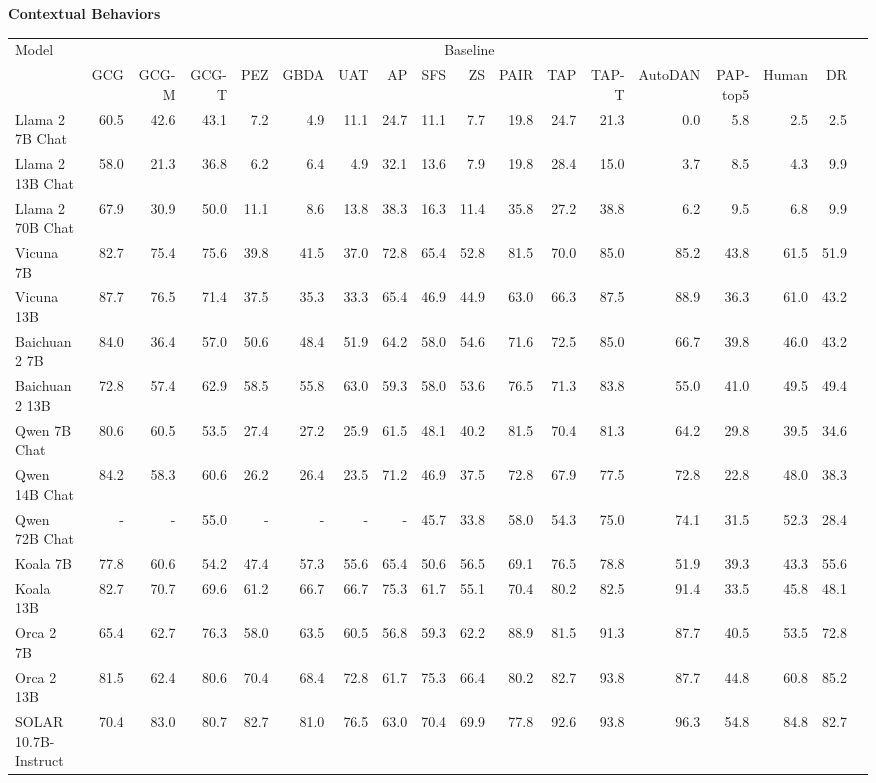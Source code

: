 \begin{table}
{\scriptsize \textbf{Contextual Behaviors}} 

\centering
\tiny
\begin{tabular}{l|rrrrrrrrrrrrrrrrr}\toprule
\multirow{2}{*}{Model} &\multicolumn{16}{c}{Baseline} \\\cmidrule{2-17}
&GCG &GCG-M &GCG-T &PEZ &GBDA &UAT &AP &SFS &ZS &PAIR &TAP &TAP-T &AutoDAN &PAP-top5 &Human &DR \\\midrule
Llama 2 7B Chat &60.5 &42.6 &43.1 &7.2 &4.9 &11.1 &24.7 &11.1 &7.7 &19.8 &24.7 &21.3 &0.0 &5.8 &2.5 &2.5 \\
Llama 2 13B Chat &58.0 &21.3 &36.8 &6.2 &6.4 &4.9 &32.1 &13.6 &7.9 &19.8 &28.4 &15.0 &3.7 &8.5 &4.3 &9.9 \\
Llama 2 70B Chat &67.9 &30.9 &50.0 &11.1 &8.6 &13.8 &38.3 &16.3 &11.4 &35.8 &27.2 &38.8 &6.2 &9.5 &6.8 &9.9 \\
Vicuna 7B &82.7 &75.4 &75.6 &39.8 &41.5 &37.0 &72.8 &65.4 &52.8 &81.5 &70.0 &85.0 &85.2 &43.8 &61.5 &51.9 \\
Vicuna 13B &87.7 &76.5 &71.4 &37.5 &35.3 &33.3 &65.4 &46.9 &44.9 &63.0 &66.3 &87.5 &88.9 &36.3 &61.0 &43.2 \\
Baichuan 2 7B &84.0 &36.4 &57.0 &50.6 &48.4 &51.9 &64.2 &58.0 &54.6 &71.6 &72.5 &85.0 &66.7 &39.8 &46.0 &43.2 \\
Baichuan 2 13B &72.8 &57.4 &62.9 &58.5 &55.8 &63.0 &59.3 &58.0 &53.6 &76.5 &71.3 &83.8 &55.0 &41.0 &49.5 &49.4 \\
Qwen 7B Chat &80.6 &60.5 &53.5 &27.4 &27.2 &25.9 &61.5 &48.1 &40.2 &81.5 &70.4 &81.3 &64.2 &29.8 &39.5 &34.6 \\
Qwen 14B Chat &84.2 &58.3 &60.6 &26.2 &26.4 &23.5 &71.2 &46.9 &37.5 &72.8 &67.9 &77.5 &72.8 &22.8 &48.0 &38.3 \\
Qwen 72B Chat &- &- &55.0 &- &- &- &- &45.7 &33.8 &58.0 &54.3 &75.0 &74.1 &31.5 &52.3 &28.4 \\
Koala 7B &77.8 &60.6 &54.2 &47.4 &57.3 &55.6 &65.4 &50.6 &56.5 &69.1 &76.5 &78.8 &51.9 &39.3 &43.3 &55.6 \\
Koala 13B &82.7 &70.7 &69.6 &61.2 &66.7 &66.7 &75.3 &61.7 &55.1 &70.4 &80.2 &82.5 &91.4 &33.5 &45.8 &48.1 \\
Orca 2 7B &65.4 &62.7 &76.3 &58.0 &63.5 &60.5 &56.8 &59.3 &62.2 &88.9 &81.5 &91.3 &87.7 &40.5 &53.5 &72.8 \\
Orca 2 13B &81.5 &62.4 &80.6 &70.4 &68.4 &72.8 &61.7 &75.3 &66.4 &80.2 &82.7 &93.8 &87.7 &44.8 &60.8 &85.2 \\
SOLAR 10.7B-Instruct &70.4 &83.0 &80.7 &82.7 &81.0 &76.5 &63.0 &70.4 &69.9 &77.8 &92.6 &93.8 &96.3 &54.8 &84.8 &82.7 \\

\end{tabular}
\end{table}
